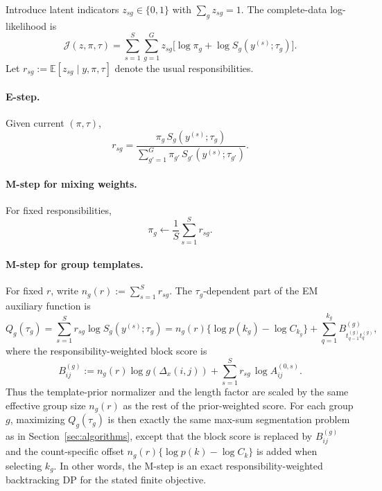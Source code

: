 Introduce latent indicators $z_{sg}\in\{0,1\}$ with $\sum_g z_{sg}=1$. The complete-data log-likelihood is
\[
\mathcal{J}(z,\pi,\tau)
 = \sum_{s=1}^S\sum_{g=1}^G z_{sg}\bigl[\log\pi_g + \log S_g(y^{(s)};\tau_g)\bigr].
\]
Let $r_{sg}:=\mathbb{E}[z_{sg}\mid y,\pi,\tau]$ denote the usual responsibilities.

\paragraph{E-step.}
Given current $(\pi,\tau)$,
\begin{equation}
r_{sg}
 = \frac{\pi_g\,S_g(y^{(s)};\tau_g)}{\sum_{g'=1}^G \pi_{g'}\,S_{g'}(y^{(s)};\tau_{g'})}.
\label{eq:template-resp}
\end{equation}

\paragraph{M-step for mixing weights.}
For fixed responsibilities,
\[
\pi_g \leftarrow \frac{1}{S}\sum_{s=1}^S r_{sg}.
\]

\paragraph{M-step for group templates.}
For fixed $r$, write $n_g(r):=\sum_{s=1}^S r_{sg}$. The $\tau_g$-dependent part of the EM
auxiliary function is
\[
Q_g(\tau_g)
 = \sum_{s=1}^S r_{sg}\log S_g(y^{(s)};\tau_g)
 = n_g(r)\{\log p(k_g)-\log C_{k_g}\}
   + \sum_{q=1}^{k_g} B^{(g)}_{t^{(g)}_{q-1}t^{(g)}_q},
\]
where the responsibility-weighted block score is
\begin{equation}
B^{(g)}_{ij}
 := n_g(r)\log g(\Delta_x(i,j)) + \sum_{s=1}^S r_{sg}\,\log A^{(0,s)}_{ij}.
\label{eq:template-blockscore}
\end{equation}
Thus the template-prior normalizer and the length factor are scaled by the same effective group
size $n_g(r)$ as the rest of the prior-weighted score. For each group $g$, maximizing
$Q_g(\tau_g)$ is then exactly the same max-sum segmentation problem as in
Section~\ref{sec:algorithms}, except that the block score is replaced by $B^{(g)}_{ij}$ and the
count-specific offset $n_g(r)\{\log p(k)-\log C_k\}$ is added when selecting $k_g$. In other
words, the M-step is an exact responsibility-weighted backtracking DP for the stated finite
objective.


